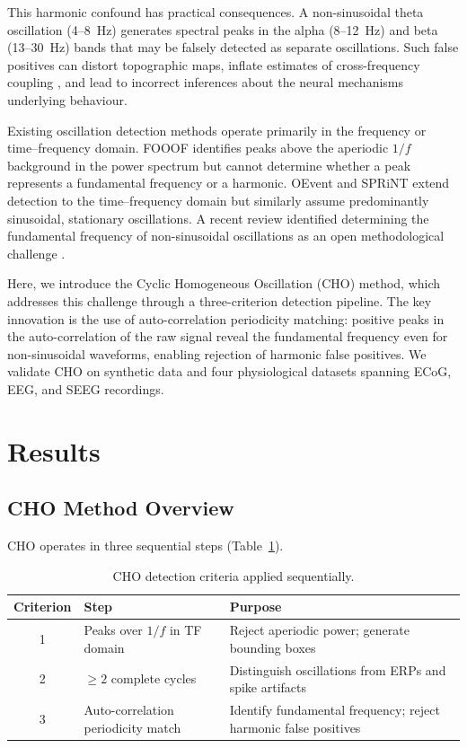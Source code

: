 \documentclass[11pt]{article}
\begin{document}
This harmonic confound has practical consequences. A non-sinusoidal theta oscillation (4--8~Hz) generates spectral peaks in the alpha (8--12~Hz) and beta (13--30~Hz) bands that may be falsely detected as separate oscillations. Such false positives can distort topographic maps, inflate estimates of cross-frequency coupling \citep{canolty2010oscillatory}, and lead to incorrect inferences about the neural mechanisms underlying behaviour.

Existing oscillation detection methods operate primarily in the frequency or time--frequency domain. FOOOF \citep{donoghue2020parameterizing} identifies peaks above the aperiodic $1/f$ background in the power spectrum but cannot determine whether a peak represents a fundamental frequency or a harmonic. OEvent \citep{neymotin2022detecting} and SPRiNT \citep{wilson2022sprint} extend detection to the time--frequency domain but similarly assume predominantly sinusoidal, stationary oscillations. A recent review identified determining the fundamental frequency of non-sinusoidal oscillations as an open methodological challenge \citep{pesaran2018investigating}.

Here, we introduce the Cyclic Homogeneous Oscillation (CHO) method, which addresses this challenge through a three-criterion detection pipeline. The key innovation is the use of auto-correlation periodicity matching: positive peaks in the auto-correlation of the raw signal reveal the fundamental frequency even for non-sinusoidal waveforms, enabling rejection of harmonic false positives. We validate CHO on synthetic data and four physiological datasets spanning ECoG, EEG, and SEEG recordings.

\section{Results}

\subsection{CHO Method Overview}

CHO operates in three sequential steps (Table~\ref{tab:criteria}).

\begin{table}[H]
\centering
\caption{CHO detection criteria applied sequentially.}
\label{tab:criteria}
\begin{tabular}{@{}clp{8cm}@{}}
\toprule
Criterion & Step & Purpose \\
\midrule
1 & Peaks over $1/f$ in TF domain & Reject aperiodic power; generate bounding boxes \\
2 & $\geq 2$ complete cycles & Distinguish oscillations from ERPs and spike artifacts \\
3 & Auto-correlation periodicity match & Identify fundamental frequency; reject harmonic false positives \\
\bottomrule
\end{tabular}
\end{table}
\end{document}
